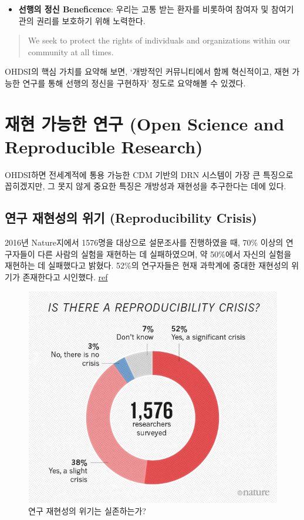 \documentclass[]{book}
\providecommand{\tightlist}{%
  \setlength{\itemsep}{0pt}\setlength{\parskip}{0pt}}
\begin{document}
\begin{itemize}
\tightlist
\item
  \textbf{선행의 정신 Beneficence}: 우리는 고통 받는 환자를 비롯하여 참여자 및 참여기관의 권리를 보호하기 위해 노력한다.
\end{itemize}

\begin{quote}
We seek to protect the rights of individuals and organizations within our community at all times.
\end{quote}

OHDSI의 핵심 가치를 요약해 보면, `개방적인 커뮤니티에서 함께 혁신적이고, 재현 가능한 연구를 통해 선행의 정신을 구현하자' 정도로 요약해볼 수 있겠다.

\hypertarget{ReproducibleResearch}{%
\section{재현 가능한 연구 (Open Science and Reproducible Research)}\label{ReproducibleResearch}}

OHDSI하면 전세계적에 통용 가능한 CDM 기반의 DRN 시스템이 가장 큰 특징으로 꼽히겠지만, 그 못지 않게 중요한 특징은 개방성과 재현성을 추구한다는 데에 있다.

\hypertarget{reproducibility-crisis}{%
\subsection{연구 재현성의 위기 (Reproducibility Crisis)}\label{reproducibility-crisis}}

2016년 Nature지에서 1576명을 대상으로 설문조사를 진행하였을 때, 70\% 이상의 연구자들이 다른 사람의 실험을 재현하는 데 실패하였으며, 약 50\%에서 자신의 실험을 재현하는 데 실패했다고 밝혔다. 52\%의 연구자들은 현재 과학계에 중대한 재현성의 위기가 존재한다고 시인했다. \href{https://www.nature.com/news/1-500-scientists-lift-the-lid-on-reproducibility-1.19970}{ref}

\begin{figure}
\includegraphics[width=0.8\linewidth]{images/OhdsiCommunity/reproducibility-graphic-online1} \caption{연구 재현성의 위기는 실존하는가?}\label{fig:isThereAReproducibilityCrisis}
\end{figure}
\end{document}
